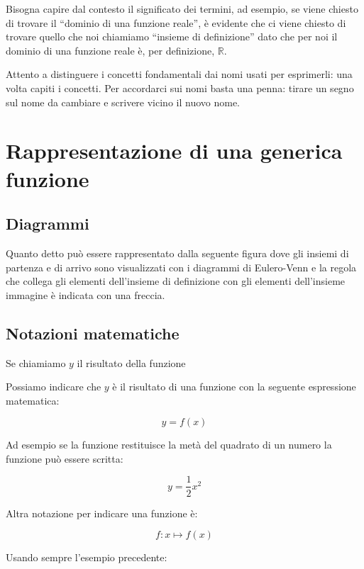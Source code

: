 Bisogna capire dal contesto il significato dei termini, ad esempio, se 
viene chiesto di trovare il ``dominio di una funzione reale'', è evidente 
che ci viene chiesto di trovare quello che noi chiamiamo ``insieme di 
definizione'' dato che per noi il dominio di una funzione reale è, per 
definizione, $\mathbb{R}$.

Attento a distinguere i concetti fondamentali dai nomi usati per 
esprimerli: una volta capiti i concetti. Per accordarci sui nomi basta una 
penna: tirare un segno sul nome da cambiare e scrivere vicino il nuovo nome.

\section{Rappresentazione di una generica funzione}
\label{sec:funzioni2_codominio}

\subsection{Diagrammi}

Quanto detto può essere rappresentato dalla seguente figura dove gli 
insiemi di partenza e di arrivo sono visualizzati con i diagrammi di 
Eulero-Venn e la regola che collega gli elementi dell'insieme di definizione 
con gli elementi dell'insieme immagine è indicata con una freccia.

\begin{center}
\end{center}

\subsection{Notazioni matematiche}

Se chiamiamo $y$ il risultato della funzione 

Possiamo indicare che $y$ è il risultato di una funzione con la seguente 
espressione matematica:

$$y=f(x)$$

Ad esempio se la funzione restituisce la metà del quadrato di un numero la 
funzione può essere scritta:

$$y=\frac{1}{2}x^2$$

Altra notazione per indicare una funzione è:

$$f: x \mapsto f(x)$$

Usando sempre l'esempio precedente:

